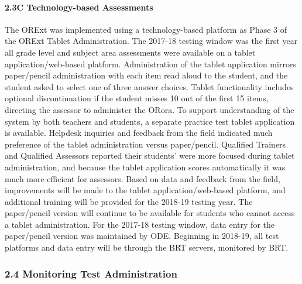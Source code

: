 \documentclass[]{article}
\let\oldparagraph\paragraph
\renewcommand{\paragraph}[1]{\oldparagraph{#1}\mbox{}}
\begin{document}
\paragraph{2.3C Technology-based
Assessments}\label{c-technology-based-assessments}

The ORExt was implemented using a technology-based platform as Phase 3
of the ORExt Tablet Administration. The 2017-18 testing window was the
first year all grade level and subject area assessments were available
on a tablet application/web-based platform. Administration of the tablet
application mirrors paper/pencil administration with each item read
aloud to the student, and the student asked to select one of three
answer choices. Tablet functionality includes optional discontinuation
if the student misses 10 out of the first 15 items, directing the
assessor to administer the ORora. To support understanding of the system
by both teachers and students, a separate practice test tablet
application is available. Helpdesk inquiries and feedback from the field
indicated much preference of the tablet administration versus
paper/pencil. Qualified Trainers and Qualified Assessors reported their
students' were more focused during tablet administration, and because
the tablet application scores automatically it was much more efficient
for assessors. Based on data and feedback from the field, improvements
will be made to the tablet application/web-based platform, and
additional training will be provided for the 2018-19 testing year. The
paper/pencil version will continue to be available for students who
cannot access a tablet administration. For the 2017-18 testing window,
data entry for the paper/pencil version was maintained by ODE. Beginning
in 2018-19, all test platforms and data entry will be through the BRT
servers, monitored by BRT.

\subsubsection{2.4 Monitoring Test
Administration}\label{monitoring-test-administration}
\end{document}
